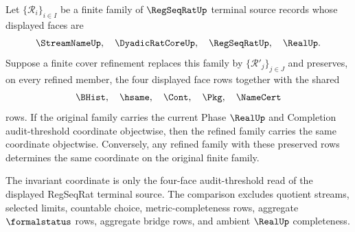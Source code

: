 \begin{theorem}
\label{thm:regseqrat-audit-threshold-finite-refinement-invariance}
Let $\{\mathcal R_i\}_{i \in I}$ be a finite family of $\RegSeqRatUp$ terminal source records whose displayed faces are
$$
\StreamNameUp,\quad \DyadicRatCoreUp,\quad \RegSeqRatUp,\quad \RealUp.
$$
Suppose a finite cover refinement replaces this family by $\{\mathcal R'_j\}_{j \in J}$ and preserves, on every refined member, the four displayed face rows together with the shared
$$
\BHist,\quad \hsame,\quad \Cont,\quad \Pkg,\quad \NameCert
$$
rows. If the original family carries the current Phase $\RealUp$ and Completion audit-threshold coordinate objectwise, then the refined family carries the same coordinate objectwise. Conversely, any refined family with these preserved rows determines the same coordinate on the original finite family.

The invariant coordinate is only the four-face audit-threshold read of the displayed RegSeqRat terminal source. The comparison excludes quotient streams, selected limits, countable choice, metric-completeness rows, aggregate $\formalstatus$ rows, aggregate bridge rows, and ambient $\RealUp$ completeness.
\end{theorem}
